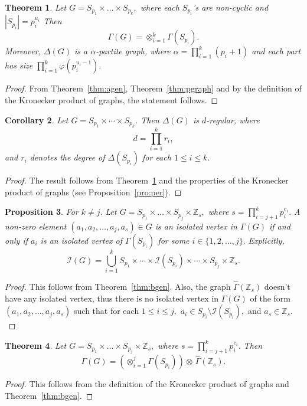 \documentclass[11pt]{article}
\def \Z {{\mathbb Z}}
\def \I {{\mathcal I}}
\def \Ga {{\Gamma}}
\newtheorem{theorem}{Theorem}[section]
\newtheorem{cor}[theorem]{Corollary}
\newtheorem{pro}[theorem]{Proposition}
\begin{document}
\begin{theorem}\label{thm:case1}
    Let $G= S_{p_1}\times  \ldots \times S_{p_k},$ where each $S_{p_i}$'s are non-cyclic and $|S_{p_i}|=p_i^{u_i}$ Then  $$\Ga(G)=\otimes_{i=1}^{k}\Ga(S_{p_i}).$$ Moreover,
    $\Delta(G)$ is a $\alpha$-partite graph, where $\alpha=\prod\limits_{i=1}^{k}(p_i+1)$ and each part has size $\prod\limits_{i=1}^{k}\varphi(p_i^{u_i-1}).$
\end{theorem}
\begin{proof}
    From Theorem~\ref{thm:agen}, Theorem~\ref{thm:pgraph} and by the definition of the Kronecker product of graphs, the statement follows.
\end{proof}
\begin{cor}\label{cor:case1}
    Let $G = S_{p_1} \times \cdots \times S_{p_k}$. Then $\Delta(G)$ is 
    $d$-regular, where
    \[
    d = \prod_{i=1}^{k} r_i,
    \]
    and $r_i$ denotes the degree of $\Delta(S_{p_i})$ for each $1 \leq i \leq k$.
\end{cor}
\begin{proof}
The result follows from Theorem~\ref{thm:case1} and the properties 
of the Kronecker product of graphs (see Proposition~\ref{pro:per}).
\end{proof}

\begin{pro}\label{pro:iso2}
   For $k\neq j.$ Let $G=S_{p_1}\times  \ldots \times  S_{p_j}\times  \Z_s,$ where $s=\prod \limits_{i=j+1}^{k}p_i^{e_i}.$  A non-zero element $(a_1,a_2,\ldots,a_j,a_s)\in G$ is an isolated vertex in $\Gamma(G)$ if and only if  $a_i$ is an isolated vertex of $\Gamma(S_{p_i})$ for some $i\in \{1,2,\ldots ,j\}.$ Explicitly, 
   $$\I(G) = \bigcup_{i=1}^{k} S_{p_1} \times \cdots \times 
   \I(S_{p_i}) \times \cdots \times S_{p_j}\times \Z_s.$$
\end{pro}
\begin{proof}
    This follows from Theorem~\ref{thm:bgen}. Also, the graph $\widehat\Ga(\Z_s)$ doesn't have any isolated vertex, thus there is no isolated vertex in $\Ga(G)$ of the form $(a_1,a_2,\dots, a_j,a_s)$ such that for each  $1\leq i\leq j,$ $ a_i\in S_{p_i}\setminus \I(S_{p_i}),$ and $a_s\in\Z_s.$
\end{proof}

\begin{theorem}\label{thm:case2}
    Let $G=S_{p_1}\times  \ldots \times  S_{p_j}\times  \Z_s,$ where $s=\prod \limits_{i=j+1}^{k}p_i^{e_i}.$ Then $$\Ga(G)=\left(\otimes_{i=1}^{j}\Ga(S_{p_i})\right)\otimes\,\widehat\Ga(\Z_s).$$ 
\end{theorem}
\begin{proof}
    This follows from the definition of the Kronecker product of graphs and Theorem~\ref{thm:bgen}.
\end{proof}
\end{document}
